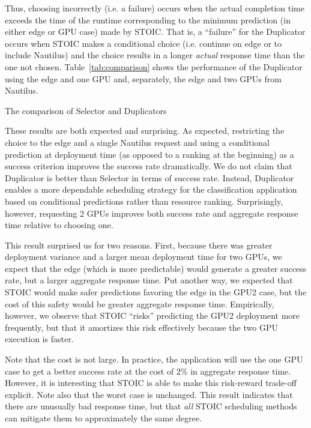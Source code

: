 Thus, choosing incorrectly (i.e. a failure) occurs when the actual completion time exceeds the time of the runtime corresponding to the minimum prediction (in either edge or GPU case) made by STOIC. That is, a ``failure'' for the Duplicator occurs when STOIC makes a conditional choice (i.e. continue on edge or to include Nautilus) and the choice results in a longer \textit{actual} response time than the one not chosen. Table~\ref{tab:comparison} shows the performance of the Duplicator using the edge and one GPU and, separately, the edge and two GPUs from Nautilus. 


\begin{table}[t] 
\centering
\resizebox{370pt}{!}{

}
\caption{
The comparison of Selector and Duplicators}
\label{tab:comparison}
\end{table}

These results are both expected and surprising. As expected, restricting the choice to the edge and a single Nautilus request and using a conditional prediction at deployment time (as opposed to a ranking at the beginning) as a success criterion improves the success rate dramatically. We do not claim that Duplicator is better than Selector in terms of success rate. Instead, Duplicator enables a more dependable scheduling strategy for the classification application based on conditional predictions rather than resource ranking. Surprisingly, however, requesting 2 GPUs improves both success rate and aggregate response time relative to choosing one.

This result surprised us for two reasons. First, because there was greater deployment variance and a larger mean deployment time for two GPUs, we expect that the edge (which is more predictable) would generate a greater success rate, but a larger aggregate response time. Put another way, we expected that STOIC would make safer predictions favoring the edge in the GPU2 case, but the cost of this safety would be greater aggregate response time. Empirically, however, we observe that STOIC ``risks'' predicting the GPU2 deployment more frequently, but that it amortizes this risk effectively because the two GPU execution is faster.

Note that the cost is not large. In practice, the application
will use the one GPU case to get a better success rate at the cost of $2\%$ in aggregate response time.  However, it is interesting that STOIC is able to make this risk-reward trade-off explicit. Note also that the worst case is unchanged. This result indicates that there are unusually bad response time, but that \textit{all} STOIC scheduling methods can mitigate them to approximately the same degree.

